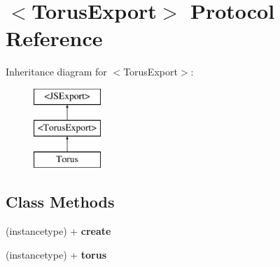 \hypertarget{protocol_torus_export-p}{}\section{$<$Torus\+Export$>$ Protocol Reference}
\label{protocol_torus_export-p}
Inheritance diagram for $<$Torus\+Export$>$\+:\begin{figure}[H]
\begin{center}
\leavevmode
\includegraphics[height=3.000000cm]{protocol_torus_export-p}
\end{center}
\end{figure}
\subsection*{Class Methods}
\begin{DoxyCompactItemize}
\item 
\hypertarget{protocol_torus_export-p_ad72761e750eed2f5d1ab4537457f99b0}{}(instancetype) + {\bfseries create}\label{protocol_torus_export-p_ad72761e750eed2f5d1ab4537457f99b0}

\item 
\hypertarget{protocol_torus_export-p_a199268bf6cf07a10ed161b619bebdc01}{}(instancetype) + {\bfseries torus}\label{protocol_torus_export-p_a199268bf6cf07a10ed161b619bebdc01}

\end{DoxyCompactItemize}
